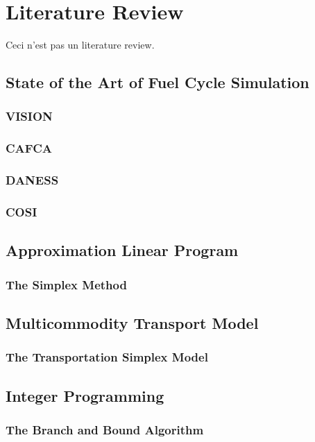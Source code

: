 \chapter{Literature Review}\label{ch:litreview}

Ceci n'est pas un literature review. 

\section{State of the Art of Fuel Cycle Simulation}\label{sec:simulators}

\subsection{VISION}
\subsection{CAFCA}
\subsection{DANESS}
\subsection{COSI}

\section{Approximation Linear Program}

\subsection{The Simplex Method}

\section{Multicommodity Transport Model}

\subsection{The Transportation Simplex Model}

\section{Integer Programming}

\subsection{The Branch and Bound Algorithm}
